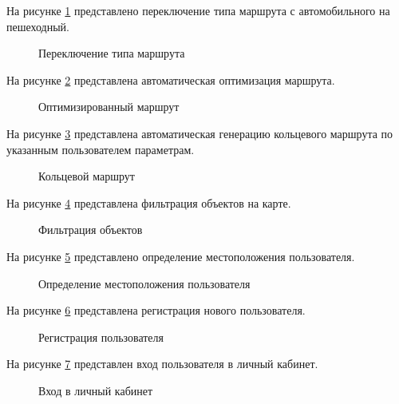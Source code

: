 \newpage
На рисунке \ref{r4:image} представлено переключение типа маршрута с автомобильного на пешеходный.

\begin{figure}[H]
	\center{\texttt{[image: r4]}}
	\caption{Переключение типа маршрута}
	\label{r4:image}
\end{figure}

\newpage
На рисунке \ref{r11:image} представлена автоматическая оптимизация маршрута.

\begin{figure}[H]
	\center{\texttt{[image: r11]}}
	\caption{Оптимизированный маршрут}
	\label{r11:image}
\end{figure}

\newpage
На рисунке \ref{r5:image} представлена автоматическая генерацию кольцевого маршрута по указанным пользователем параметрам.

\begin{figure}[H]
	\center{\texttt{[image: r5]}}
	\caption{Кольцевой маршрут}
	\label{r5:image}
\end{figure}

\newpage
На рисунке \ref{r6:image} представлена фильтрация объектов на карте.

\begin{figure}[H]
	\center{\texttt{[image: r6]}}
	\caption{Фильтрация объектов}
	\label{r6:image}
\end{figure}

\newpage
На рисунке \ref{r7:image} представлено определение местоположения пользователя.

\begin{figure}[H]
	\center{\texttt{[image: r7]}}
	\caption{Определение местоположения пользователя}
	\label{r7:image}
\end{figure}

\newpage
На рисунке \ref{r8:image} представлена регистрация нового пользователя.

\begin{figure}[H]
	\center{\texttt{[image: r8]}}
	\caption{Регистрация пользователя}
	\label{r8:image}
\end{figure}

\newpage
На рисунке \ref{r9:image} представлен вход пользователя в личный кабинет.

\begin{figure}[H]
	\center{\texttt{[image: r9]}}
	\caption{Вход в личный кабинет}
	\label{r9:image}
\end{figure}

